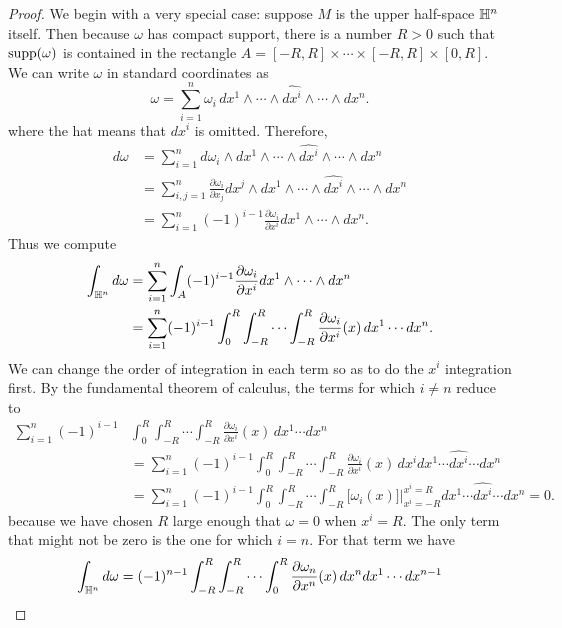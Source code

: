 \begin{proof}
We begin with a very special case: suppose $M$ is the upper half-space $\mathbb{H}^n$ itself. Then because $\omega$ has compact support, there is a number $R>0$ such that $\mathrm{supp}(\omega)$ is contained in the rectangle $A=[-R,R]\times\cdots\times[-R,R]\times[0,R]$. We can write $\omega$ in standard coordinates as
\[\omega=\sum_{i=1}^{n}\omega_i\,dx^1\wedge\cdots\wedge\widehat{dx^i}\wedge\cdots\wedge dx^n.\]
where the hat means that $dx^i$ is omitted. Therefore,
\begin{align*}
d\omega&=\sum_{i=1}^{n}d\omega_i\wedge dx^1\wedge\cdots\wedge\widehat{dx^i}\wedge\cdots\wedge dx^n\\
&=\sum_{i,j=1}^{n}\frac{\partial\omega_i}{\partial x_j}dx^j\wedge dx^1\wedge\cdots\wedge\widehat{dx^i}\wedge\cdots\wedge dx^n\\
&=\sum_{i=1}^{n}(-1)^{i-1}\frac{\partial\omega_i}{\partial x^i}dx^1\wedge\cdots\wedge dx^n.
\end{align*}
Thus we compute
\begin{align*}
\int_{\mathbb{H}^n}d\omega&=\sum_{i=1}^{n}\int_{A}(-1)^{i-1}\frac{\partial\omega_i}{\partial x^i}dx^1\wedge\cdots\wedge dx^n\\
&=\sum_{i=1}^{n}(-1)^{i-1}\int_{0}^{R}\int_{-R}^{R}\cdots\int_{-R}^{R}\frac{\partial\omega_i}{\partial x^i}(x)\,dx^1\cdots dx^n.
\end{align*}
We can change the order of integration in each term so as to do the $x^i$ integration first. By the fundamental theorem of calculus, the terms for which $i\neq n$ reduce to
\begin{align*}
\sum_{i=1}^{n}(-1)^{i-1}&\int_{0}^{R}\int_{-R}^{R}\cdots\int_{-R}^{R}\frac{\partial\omega_i}{\partial x^i}(x)\,dx^1\cdots dx^n\\
&=\sum_{i=1}^{n}(-1)^{i-1}\int_{0}^{R}\int_{-R}^{R}\cdots\int_{-R}^{R}\frac{\partial\omega_i}{\partial x^i}(x)\,dx^idx^1\cdots\widehat{dx^i}\cdots dx^n\\
&=\sum_{i=1}^{n}(-1)^{i-1}\int_{0}^{R}\int_{-R}^{R}\cdots\int_{-R}^{R}\Big[\omega_i(x)\Big]\Big|^{x^i=R}_{x^i=-R}dx^1\cdots\widehat{dx^i}\cdots dx^n=0.
\end{align*}
because we have chosen $R$ large enough that $\omega=0$ when $x^i=R$. The only term that might not be zero is the one for which $i=n$. For that term we have
\begin{align}\label{Stokes-2}
\int_{\H^n}d\omega&=(-1)^{n-1}\int_{-R}^{R}\int_{-R}^{R}\cdots\int_{0}^{R}\frac{\partial\omega_n}{\partial x^n}(x)\,dx^ndx^1\cdots dx^{n-1} \notag\\

\end{align}
\end{proof}
